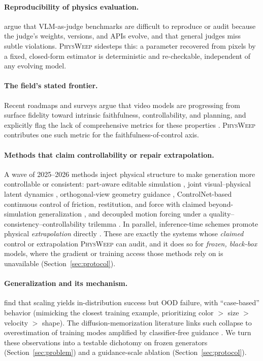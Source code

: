 \paragraph{Reproducibility of physics evaluation.}
\citet{phyground2026} argue that VLM-as-judge benchmarks are difficult to
reproduce or audit because the judge's weights, versions, and APIs evolve, and
that general judges miss subtle violations. \textsc{PhysWeep} sidesteps this: a
parameter recovered from pixels by a fixed, closed-form estimator is
deterministic and re-checkable, independent of any evolving model.

\paragraph{The field's stated frontier.}
Recent roadmaps and surveys argue that video models are progressing from
surface fidelity toward intrinsic faithfulness, controllability, and planning,
and explicitly flag the lack of comprehensive metrics for these properties
\citep{roadmap2025visualworld,evolution2026videogen}. \textsc{PhysWeep}
contributes one such metric for the faithfulness-of-control axis.

\paragraph{Methods that claim controllability or repair extrapolation.}
A wave of 2025--2026 methods inject physical structure to make generation more
controllable or consistent: part-aware editable simulation
\citep{physchoreo2025}, joint visual--physical latent dynamics
\citep{phantom2026}, orthogonal-view geometry guidance \citep{physvideo2026},
ControlNet-based continuous control of friction, restitution, and force with
claimed beyond-simulation generalization \citep{phyco2026}, and decoupled motion
forcing under a quality--consistency--controllability trilemma
\citep{motionforcing2026}. In parallel, inference-time schemes promote physical
\emph{extrapolation} directly \citep{lapg2026}. These are exactly the systems
whose \emph{claimed} control or extrapolation \textsc{PhysWeep} can audit, and it
does so for \emph{frozen, black-box} models, where the gradient or training
access those methods rely on is unavailable (Section~\ref{sec:protocol}).

\paragraph{Generalization and its mechanism.}
\citet{kang2025howfar} find that scaling yields in-distribution success but OOD
failure, with ``case-based'' behavior (mimicking the closest training example,
prioritizing color $>$ size $>$ velocity $>$ shape). The diffusion-memorization
literature links such collapse to overestimation of training modes amplified by
classifier-free guidance \citep{diffmemorize2025}. We turn these observations
into a testable dichotomy on frozen generators (Section~\ref{sec:problem}) and a
guidance-scale ablation (Section~\ref{sec:protocol}).

